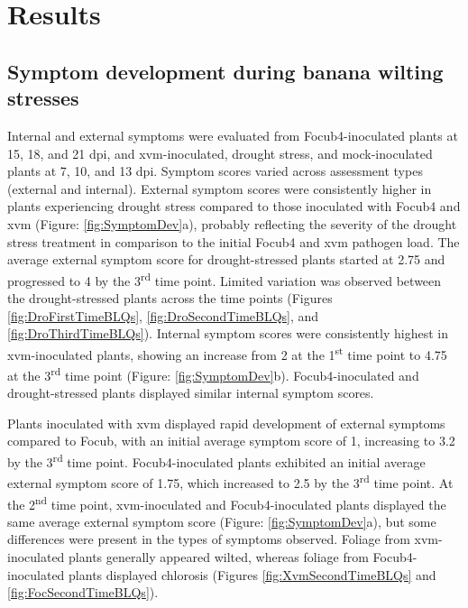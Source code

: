 \newpage
\section{Results}

\subsection{Symptom development during banana wilting stresses}

Internal and external symptoms were evaluated from \ac{Focub4}-inoculated plants at 15, 18, and 21 \ac{dpi}, and \ac{xvm}-inoculated, drought stress, and mock-inoculated plants at 7, 10, and 13 \ac{dpi}. Symptom scores varied across assessment types (external and internal). External symptom scores were consistently higher in plants experiencing drought stress compared to those inoculated with \ac{Focub4} and \ac{xvm} (Figure: \ref{fig:SymptomDev}a), probably reflecting the severity of the drought stress treatment in comparison to the initial \ac{Focub4} and \ac{xvm} pathogen load. The average external symptom score for drought-stressed plants started at 2.75 and progressed to 4 by the 3\textsuperscript{rd} time point. Limited variation was observed between the drought-stressed plants across the time points (Figures \ref{fig:DroFirstTimeBLQs}, \ref{fig:DroSecondTimeBLQs}, and \ref{fig:DroThirdTimeBLQs}). Internal symptom scores were consistently highest in \ac{xvm}-inoculated plants, showing an increase from 2 at the 1\textsuperscript{st} time point to 4.75 at the 3\textsuperscript{rd} time point (Figure: \ref{fig:SymptomDev}b). \Ac{Focub4}-inoculated and drought-stressed plants displayed similar internal symptom scores.

Plants inoculated with \ac{xvm} displayed rapid development of external symptoms compared to \ac{Focub}, with an initial average symptom score of 1, increasing to 3.2 by the 3\textsuperscript{rd} time point. \ac{Focub4}-inoculated plants exhibited an initial average external symptom score of 1.75, which increased to 2.5 by the 3\textsuperscript{rd} time point. At the 2\textsuperscript{nd} time point, \ac{xvm}-inoculated and \ac{Focub4}-inoculated plants displayed the same average external symptom score (Figure: \ref{fig:SymptomDev}a), but some differences were present in the types of symptoms observed. Foliage from \ac{xvm}-inoculated plants generally appeared wilted, whereas foliage from \ac{Focub4}-inoculated plants displayed chlorosis (Figures \ref{fig:XvmSecondTimeBLQs} and \ref{fig:FocSecondTimeBLQs}).
 
